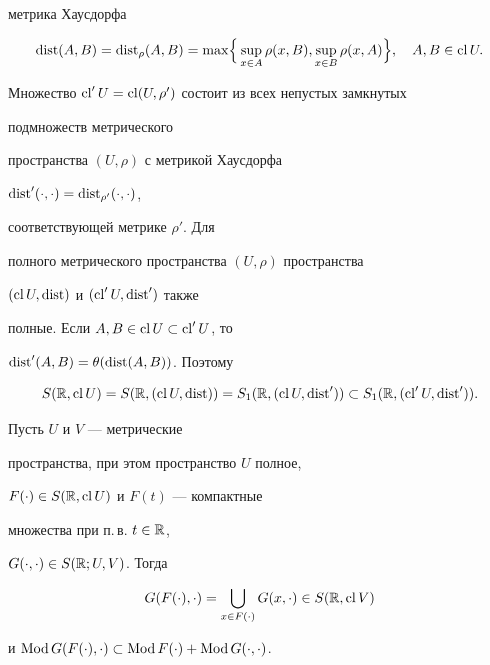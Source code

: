 метрика Хаусдорфа


$$


\dist(A,B)=\dist_\rho(A,B)=\max\Bigl\{\,


\sup_{x\in A}\rho(x,B),\sup_{x\in B}\rho(x,A)\Bigr\},\quad


A,B\in\cl U.


$$


Множество $\operatorname{cl}'U=\operatorname{cl}(U,\rho')$ состоит из всех непустых замкнутых


подмножеств метрического


пространства $(U,\rho)$ с метрикой Хаусдорфа


$\operatorname{dist}'(\cdot,\cdot)=\operatorname{dist}_{\rho'}(\cdot,\cdot)$,


соответствующей метрике $\rho'$. Для


полного метрического пространства $(U,\rho)$ пространства


$(\operatorname{cl} U,\operatorname{dist})$ и $(\operatorname{cl}'U,\operatorname{dist}')$ также


полные. Если $A,B\in\operatorname{cl} U\subset\operatorname{cl}' U$, то


$\operatorname{dist}'(A,B)=\theta(\operatorname{dist}(A,B))$. Поэтому


$$


S(\Bbb R,\cl U)=S(\Bbb R,(\cl U,\dist))=


S_1(\Bbb R,(\cl U,\dist'))\subset


S_1(\Bbb R,(\cl'U,\dist')).


$$





\begin{thm}


Пусть $U$ и $V$ --- метрические


пространства, при этом пространство $U$ полное,


$F(\cdot)\in S(\Bbb R,\operatorname{cl} U)$ и $F(t)$ --- компактные


множества при п.\,в. $t\in\Bbb R$,


$G(\cdot,\cdot)\in S(\Bbb R;U,V)$. Тогда


$$


G(F(\cdot),\cdot)=\bigcup_{x\in F(\cdot)}G(x,\cdot)


\in S(\Bbb R,\cl V)


$$


и $\operatorname{Mod} G(F(\cdot),\cdot)\subset\operatorname{Mod} F(\cdot)+\operatorname{Mod} G(\cdot,\cdot)$.


\end{thm}





